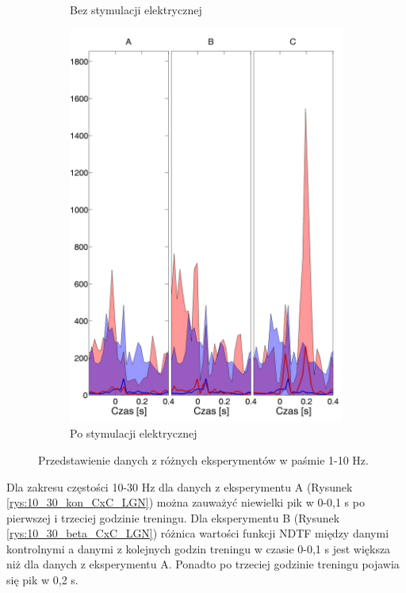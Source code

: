 \documentclass{pracamgr}
\begin{document}
\begin{figure}[h]
\begin{subfigure}{.5\textwidth}
			\caption{Bez stymulacji elektrycznej}
			\label{rys:1_10_kon_CxC_LGN}
		\end{subfigure}%
		\begin{subfigure}{.5\textwidth}
			\centering
			\includegraphics[width=1.\linewidth]{beta3_1-10_z_CxC5_do_LGN42.png}
			\caption{Po stymulacji elektrycznej}
			\label{rys:1_10_beta_CxC_LGN}
		\end{subfigure}
		\caption{Przedstawienie danych z różnych eksperymentów w paśmie 1-10 Hz.}
		\label{rys:1_10_CxC_LGN}
	\end{figure}
	\FloatBarrier
	Dla zakresu częstości 10-30 Hz dla danych z eksperymentu A (Rysunek \ref{rys:10_30_kon_CxC_LGN}) można zauważyć niewielki pik w 0-0,1 s po pierwszej i trzeciej godzinie treningu. Dla eksperymentu B (Rysunek \ref{rys:10_30_beta_CxC_LGN}) różnica wartości funkcji NDTF między danymi kontrolnymi a danymi z kolejnych godzin treningu w czasie 0-0,1 s jest większa niż dla danych z eksperymentu A. Ponadto po trzeciej godzinie treningu pojawia się pik w 0,2 s.
\end{document}
